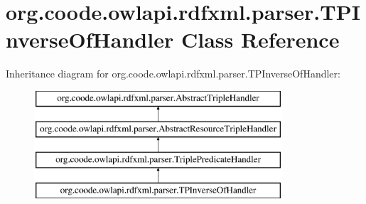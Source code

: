 \hypertarget{classorg_1_1coode_1_1owlapi_1_1rdfxml_1_1parser_1_1_t_p_inverse_of_handler}{\section{org.\-coode.\-owlapi.\-rdfxml.\-parser.\-T\-P\-Inverse\-Of\-Handler Class Reference}
\label{classorg_1_1coode_1_1owlapi_1_1rdfxml_1_1parser_1_1_t_p_inverse_of_handler}
}
Inheritance diagram for org.\-coode.\-owlapi.\-rdfxml.\-parser.\-T\-P\-Inverse\-Of\-Handler\-:\begin{figure}[H]
\begin{center}
\leavevmode
\includegraphics[height=4.000000cm]{classorg_1_1coode_1_1owlapi_1_1rdfxml_1_1parser_1_1_t_p_inverse_of_handler}
\end{center}
\end{figure}
